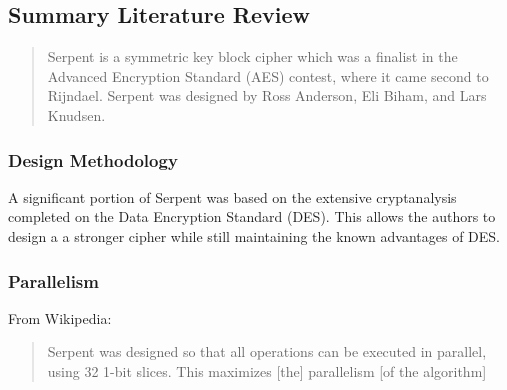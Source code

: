 \subsection{Summary Literature Review}
\label{litReview}
\blockquote{Serpent is a symmetric key block cipher which was a finalist in the Advanced Encryption Standard (AES) contest, where it came second to Rijndael. Serpent was designed by Ross Anderson, Eli Biham, and Lars Knudsen.}\cite{wikipedia}

\subsubsection{Design Methodology}

A significant portion of Serpent was based on the extensive cryptanalysis completed on the Data Encryption Standard (DES). \cite{submission} This allows the authors to design a a stronger cipher while still maintaining the known advantages of DES.

\subsubsection{Parallelism}

From Wikipedia: \blockquote[\cite{wikipedia}]{Serpent was designed so that all operations can be executed in parallel, using 32 1-bit slices. This maximizes [the] parallelism [of the algorithm]}

